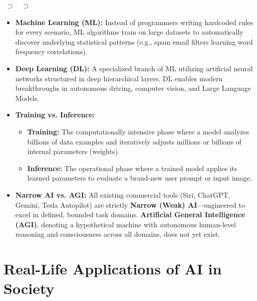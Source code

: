 \begin{center}
 $\;\supset\;$
 $\;\supset\;$
\end{center}

\begin{itemize}[leftmargin=1.2em]
    \item \textbf{Machine Learning (ML):} Instead of programmers writing hardcoded rules for every scenario, ML algorithms train on large datasets to automatically discover underlying statistical patterns (e.g., spam email filters learning word frequency correlations).
    \item \textbf{Deep Learning (DL):} A specialized branch of ML utilizing artificial neural networks structured in deep hierarchical layers. DL enables modern breakthroughs in autonomous driving, computer vision, and Large Language Models.
    \item \textbf{Training vs. Inference:}
    \begin{itemize}
        \item \textbf{Training:} The computationally intensive phase where a model analyzes billions of data examples and iteratively adjusts millions or billions of internal parameters (weights).
        \item \textbf{Inference:} The operational phase where a trained model applies its learned parameters to evaluate a brand-new user prompt or input image.
    \end{itemize}
    \item \textbf{Narrow AI vs. AGI:} All existing commercial tools (Siri, ChatGPT, Gemini, Tesla Autopilot) are strictly \textbf{Narrow (Weak) AI}---engineered to excel in defined, bounded task domains. \textbf{Artificial General Intelligence (AGI)}, denoting a hypothetical machine with autonomous human-level reasoning and consciousness across all domains, does not yet exist.
\end{itemize}

\section{Real-Life Applications of AI in Society}

